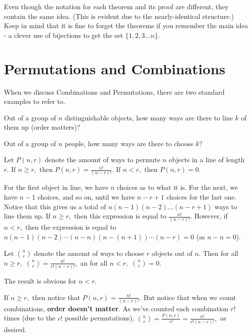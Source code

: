 \documentclass{article}
\begin{document}
Even though the notation for each theorem and its proof are different, they contain the same idea. (This is evident due to the nearly-identical structure.) Keep in mind that it is fine to forget the theorems if you remember the main idea - a clever use of bijections to get the set $\{1,2,3\dots n\}.$

\section{Permutations and Combinations}

When we discuss Combinations and Permutations, there are two standard examples to refer to.

\begin{exam}[Permutations]
Out of a group of $n$ distinguishable objects, how many ways are there to line $k$ of them up (order matters)?
\end{exam}

\begin{exam}[Combinations]
Out of a group of $n$ people, how many ways are there to choose $k?$
\end{exam}

\begin{theo}[Permutations]
Let $P(n,r)$ denote the amount of ways to permute $n$ objects in a line of length $r.$ If $n\geq r,$ then $P(n,r)=\frac{n!}{(n-r)!}.$ If $n<r,$ then $P(n,r)=0.$
\end{theo}

\begin{pro}
For the first object in line, we have $n$ choices as to what it is. For the next, we have $n-1$ choices, and so on, until we have $n-r+1$ choices for the last one. Notice that this gives us a total of $n(n-1)(n-2)\dots(n-r+1)$ ways to line them up. If $n\geq r,$ then this expression is equal to $\frac{n!}{(n-r)!}.$ However, if $n<r,$ then the expression is equal to $n(n-1)(n-2)\cdots(n-n)(n-(n+1))\cdots(n-r)=0$ (as $n-n=0$).
\end{pro}

\begin{theo}[Combinations]
Let $\binom{n}{r}$ denote the amount of ways to choose $r$ objects out of $n.$ Then for all $n\geq r,$ $\binom{n}{r}=\frac{n!}{r!(n-r)!},$ an for all $n<r,$ $\binom{n}{r}=0.$
\end{theo}

\begin{pro}
The result is obvious for $n<r.$

If $n\geq r,$ then notice that $P(n,r)=\frac{n!}{(n-r)!}.$ But notice that when we count combinations, \textbf{order doesn't matter}. As we've counted each combination $r!$ times (due to the $r!$ possible permutations), $\binom{n}{r}=\frac{P(n,r)}{r!}=\frac{n!}{r!(n-r)!},$ as desired.
\end{pro}
\end{document}
